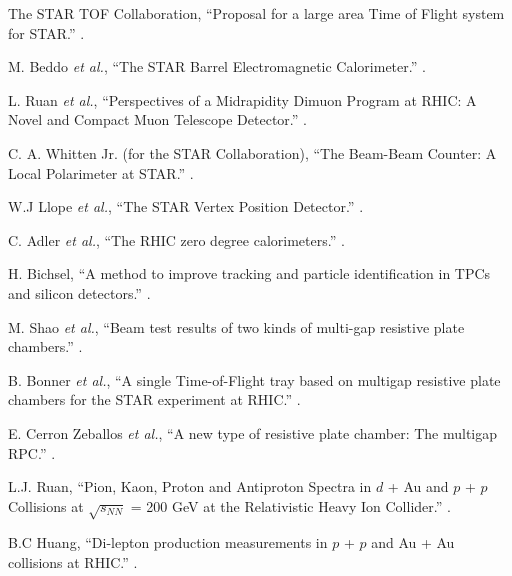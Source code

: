 \begin{thebibliography}{10}
The STAR TOF Collaboration,
\newblock ``Proposal for a large area Time of Flight system for STAR.''
.

M. Beddo {\it et al.},
\newblock ``The STAR Barrel Electromagnetic Calorimeter.''
.

L. Ruan {\it et al.},
\newblock ``Perspectives of a Midrapidity Dimuon Program at RHIC: A Novel and Compact Muon Telescope Detector.''
.

C. A. Whitten Jr. (for the STAR Collaboration),
\newblock ``The Beam-Beam Counter: A Local Polarimeter at STAR.''
.

W.J Llope {\it et al.},
\newblock ``The STAR Vertex Position Detector.''
.

C. Adler {\it et al.},
\newblock ``The RHIC zero degree calorimeters.''
.

H. Bichsel,
\newblock ``A method to improve tracking and particle identification in TPCs and silicon detectors.''
.

M. Shao {\it et al.},
\newblock ``Beam test results of two kinds of multi-gap resistive plate chambers.''
.

B. Bonner {\it et al.},
\newblock ``A single Time-of-Flight tray based on multigap resistive plate chambers for the STAR experiment at RHIC.''
.

E. Cerron Zeballos {\it et al.},
\newblock ``A new type of resistive plate chamber: The multigap RPC.''
.

L.J. Ruan,
\newblock ``Pion, Kaon, Proton and Antiproton Spectra in $d$ + Au and $p$ + $p$ Collisions
at $\sqrt{s_{NN}}$ = 200 GeV at the Relativistic Heavy Ion Collider.''
.

B.C Huang,
\newblock ``Di-lepton production measurements in $p$ + $p$ and Au + Au collisions at RHIC.''
.


\end{thebibliography}

